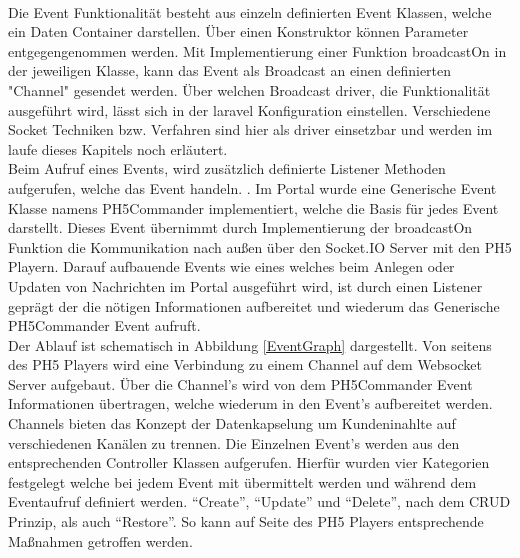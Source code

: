 \\Die Event Funktionalität besteht aus einzeln definierten Event Klassen, welche ein Daten Container darstellen. Über einen Konstruktor können Parameter entgegengenommen werden. Mit Implementierung einer Funktion broadcastOn in der jeweiligen Klasse, kann das Event als Broadcast an einen definierten "Channel" gesendet werden. Über welchen Broadcast driver, die Funktionalität ausgeführt wird, lässt sich in der laravel Konfiguration einstellen. Verschiedene Socket Techniken bzw. Verfahren sind hier als driver einsetzbar und werden im laufe dieses Kapitels noch erläutert.
\\Beim Aufruf eines Events, wird zusätzlich definierte Listener Methoden aufgerufen, welche das Event handeln. \cite{Laravel: Up and Running: A Framework for Building Modern PHP Apps}. 
Im Portal wurde eine Generische Event Klasse namens PH5Commander implementiert, welche die Basis für jedes Event darstellt. Dieses Event übernimmt durch Implementierung der broadcastOn Funktion die Kommunikation nach außen über den Socket.IO Server mit den PH5 Playern. Darauf aufbauende Events wie \zB eines welches beim Anlegen oder Updaten von Nachrichten im Portal ausgeführt wird, ist durch einen Listener geprägt der die nötigen Informationen aufbereitet und wiederum das Generische PH5Commander Event aufruft.\\
Der Ablauf  ist schematisch in Abbildung \ref{EventGraph} \textit{}  dargestellt. Von seitens des PH5 Players wird eine Verbindung zu einem Channel auf dem Websocket Server aufgebaut. Über die Channel's wird von dem PH5Commander Event Informationen übertragen, welche wiederum in den Event's aufbereitet werden. Channels bieten das Konzept der Datenkapselung um Kundeninahlte auf verschiedenen Kanälen zu trennen. 
Die Einzelnen Event's werden aus den entsprechenden Controller Klassen aufgerufen. Hierfür wurden vier Kategorien festgelegt welche bei jedem Event mit übermittelt werden und während dem Eventaufruf definiert werden. "`Create"', "`Update"' und "`Delete"', nach dem CRUD Prinzip, als auch "`Restore"'. So kann auf Seite des PH5 Players entsprechende Maßnahmen getroffen werden.
